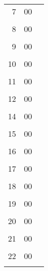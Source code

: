 \renewcommand{\arraystretch}{1.1}
\begin{tabularx}{0.9\linewidth}{r@{:}lX}
\toprule[1.2pt]
7&00 & \\\hdashline[2pt/2pt]
\multicolumn{2}{c}{}& \\\midrule[0.3pt]
8&00 & \\\hdashline[2pt/2pt]
\multicolumn{2}{c}{}& \\\midrule[0.3pt]
9&00 & \\\hdashline[2pt/2pt]
\multicolumn{2}{c}{}& \\\midrule[0.3pt]
10&00 & \\\hdashline[2pt/2pt]
\multicolumn{2}{c}{}& \\\midrule[0.3pt]
11&00 & \\\hdashline[2pt/2pt]
\multicolumn{2}{c}{}& \\\midrule[0.8pt]
12&00 & \\\hdashline[2pt/2pt]
\multicolumn{2}{c}{}& \\\midrule[0.8pt]
14&00 & \\\hdashline[2pt/2pt]
\multicolumn{2}{c}{}& \\\midrule[0.3pt]
15&00 & \\\hdashline[2pt/2pt]
\multicolumn{2}{c}{}& \\\midrule[0.3pt]
16&00 & \\\hdashline[2pt/2pt]
\multicolumn{2}{c}{}& \\\midrule[0.3pt]
17&00 & \\\hdashline[2pt/2pt]
\multicolumn{2}{c}{}& \\\midrule[0.8pt]
18&00 & \\\hdashline[2pt/2pt]
\multicolumn{2}{c}{}& \\\midrule[0.3pt]
19&00 & \\\hdashline[2pt/2pt]
\multicolumn{2}{c}{}& \\\midrule[0.3pt]
20&00 & \\\hdashline[2pt/2pt]
\multicolumn{2}{c}{}& \\\midrule[0.3pt]
21&00 & \\\hdashline[2pt/2pt]
\multicolumn{2}{c}{}& \\\midrule[0.3pt]
22&00 & \\\hdashline[2pt/2pt]
\multicolumn{2}{c}{}& \\%
\bottomrule[1.2pt]
\end{tabularx}